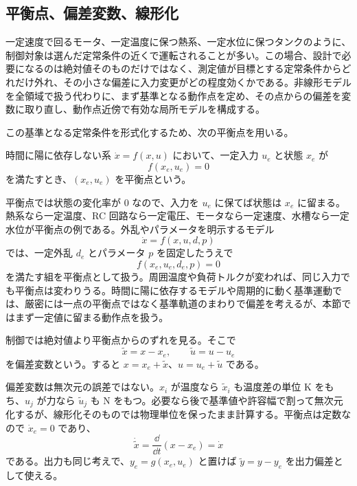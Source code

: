 \subsection{平衡点、偏差変数、線形化}

一定速度で回るモータ、一定温度に保つ熱系、一定水位に保つタンクのように、制御対象は選んだ定常条件の近くで運転されることが多い。この場合、設計で必要になるのは絶対値そのものだけではなく、測定値が目標とする定常条件からどれだけ外れ、その小さな偏差に入力変更がどの程度効くかである。非線形モデルを全領域で扱う代わりに、まず基準となる動作点を定め、その点からの偏差を変数に取り直し、動作点近傍で有効な局所モデルを構成する。

この基準となる定常条件を形式化するため、次の平衡点を用いる。

\begin{definition}[平衡点]
時間に陽に依存しない系 $\dot{x}=f(x,u)$ において、一定入力 $u_e$ と状態 $x_e$ が
\begin{equation}
  f(x_e,u_e)=0
\end{equation}
を満たすとき、$(x_e,u_e)$ を平衡点という。
\end{definition}

平衡点では状態の変化率が 0 なので、入力を $u_e$ に保てば状態は $x_e$ に留まる。熱系なら一定温度、RC 回路なら一定電圧、モータなら一定速度、水槽なら一定水位が平衡点の例である。外乱やパラメータを明示するモデル
\begin{equation}
  \dot{x}=f(x,u,d,p)
\end{equation}
では、一定外乱 $d_e$ とパラメータ $p$ を固定したうえで
\begin{equation}
  f(x_e,u_e,d_e,p)=0
\end{equation}
を満たす組を平衡点として扱う。周囲温度や負荷トルクが変われば、同じ入力でも平衡点は変わりうる。時間に陽に依存するモデルや周期的に動く基準運動では、厳密には一点の平衡点ではなく基準軌道のまわりで偏差を考えるが、本節ではまず一定値に留まる動作点を扱う。

\begin{definition}[偏差変数]
制御では絶対値より平衡点からのずれを見る。そこで
\begin{equation}
  \tilde{x}=x-x_e,
  \qquad
  \tilde{u}=u-u_e
  \label{eq:deviation-definition}
\end{equation}
を偏差変数という。すると $x=x_e+\tilde{x}$、$u=u_e+\tilde{u}$ である。
\end{definition}

偏差変数は無次元の誤差ではない。$x_i$ が温度なら $\tilde{x}_i$ も温度差の単位 K をもち、$u_j$ が力なら $\tilde{u}_j$ も N をもつ。必要なら後で基準値や許容幅で割って無次元化するが、線形化そのものでは物理単位を保ったまま計算する。平衡点は定数なので $\dot{x}_e=0$ であり、
\begin{equation}
  \dot{\tilde{x}}=\frac{\dd}{\dd t}(x-x_e)=\dot{x}
\end{equation}
である。出力も同じ考えで、$y_e=g(x_e,u_e)$ と置けば $\tilde{y}=y-y_e$ を出力偏差として使える。

